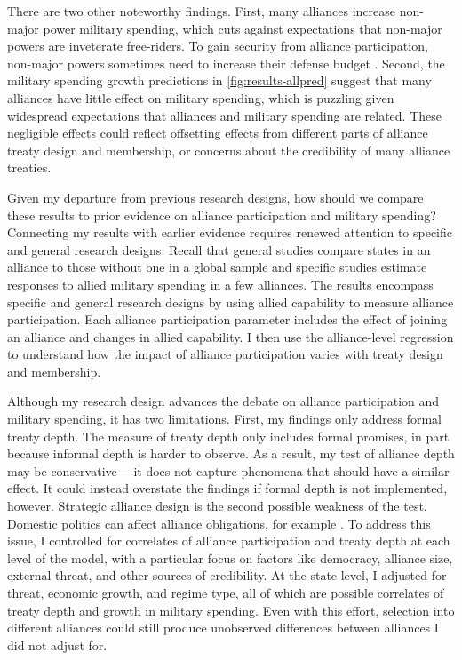 \documentclass[12pt]{article}
\begin{document}
There are two other noteworthy findings.  
First, many alliances increase non-major power military spending, which cuts against expectations that non-major powers are inveterate free-riders. 
To gain security from alliance participation, non-major powers sometimes need to increase their defense budget \citep{Horowitzetal2017}. 
Second, the military spending growth predictions in \autoref{fig:results-allpred} suggest that many alliances have little effect on military spending, which is puzzling given widespread expectations that alliances and military spending are related. 
These negligible effects could reflect offsetting effects from different parts of alliance treaty design and membership, or concerns about the credibility of many alliance treaties. 


Given my departure from previous research designs, how should we compare these results to prior evidence on alliance participation and military spending? 
Connecting my results with earlier evidence requires renewed attention to specific and general research designs. 
Recall that general studies compare states in an alliance to those without one in a global sample and specific studies estimate responses to allied military spending in a few alliances. 
The results encompass specific and general research designs by using allied capability to measure alliance participation. 
Each alliance participation parameter includes the effect of joining an alliance and changes in allied capability. 
I then use the alliance-level regression to understand how the impact of alliance participation varies with treaty design and membership.   


Although my research design advances the debate on alliance participation and military spending, it has two limitations. 
First, my findings only address formal treaty depth. 
The measure of treaty depth only includes formal promises, in part because informal depth is harder to observe. 
As a result, my test of alliance depth may be conservative--- it does not capture phenomena that should have a similar effect. 
It could instead overstate the findings if formal depth is not implemented, however. 
Strategic alliance design is the second possible weakness of the test. 
Domestic politics can affect alliance obligations, for example \citep{Davis2004, Chibaetal2015}.   
To address this issue, I controlled for correlates of alliance participation and treaty depth at each level of the model, with a particular focus on factors like democracy, alliance size, external threat, and other sources of credibility.
At the state level, I adjusted for threat, economic growth, and regime type, all of which are possible correlates of treaty depth and growth in military spending. 
Even with this effort, selection into different alliances could still produce unobserved differences between alliances I did not adjust for. 
\end{document}

